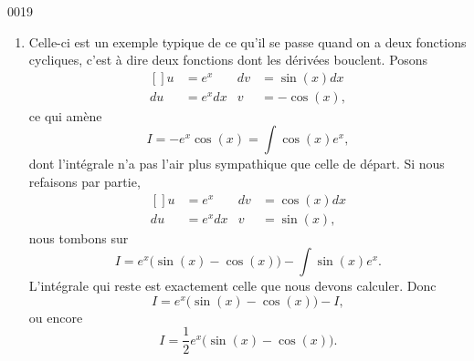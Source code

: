 \begin{corrige}{0019}
\begin{enumerate}
\item
Celle-ci est un exemple typique de ce qu'il se passe quand on a deux fonctions \og cycliques\fg, c'est à dire deux fonctions dont les dérivées bouclent. Posons
\begin{equation}
	\begin{aligned}[]
		u&=e^x		&	dv&=\sin(x)dx\\
		du&=e^xdx	&	v&=-\cos(x),
	\end{aligned}
\end{equation}
ce qui amène
\begin{equation}
	I=-e^x\cos(x)=\int\cos(x)e^x,
\end{equation}
dont l'intégrale n'a pas l'air plus sympathique que celle de départ. Si nous refaisons par partie,
\begin{equation}
	\begin{aligned}[]
		u&=e^x		&	dv&=\cos(x)dx\\
		du&=e^xdx	&	v&=\sin(x),
	\end{aligned}
\end{equation}
nous tombons sur
\begin{equation}
	I=e^x\big( \sin(x)-\cos(x) \big)-\int\sin(x)e^x.
\end{equation}
L'intégrale qui reste est exactement celle que nous devons calculer. Donc
\begin{equation}
	I=e^x\big( \sin(x)-\cos(x) \big)-I,
\end{equation}
ou encore
\begin{equation}
	I=\frac{1}{ 2 }e^x\big( \sin(x)-\cos(x) \big).
\end{equation}

\end{enumerate}


\end{corrige}
